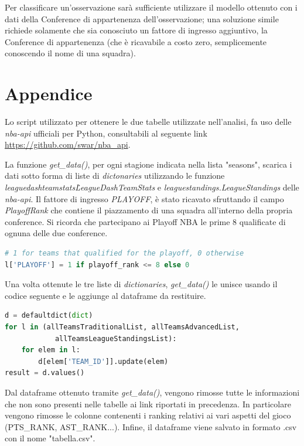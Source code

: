 \documentclass[11pt,a4paper]{article}
\begin{document}
Per classificare un'osservazione sarà sufficiente utilizzare il modello ottenuto con i dati della Conference di appartenenza dell'osservazione; una soluzione simile richiede solamente che sia conosciuto un fattore di ingresso aggiuntivo, la Conference di appartenenza (che è ricavabile a costo zero, semplicemente conoscendo il nome di una squadra).

\newpage
\appendix
\section{Appendice}
 Lo script utilizzato per ottenere le due tabelle utilizzate nell'analisi, fa uso delle \emph{nba-api} ufficiali per Python, consultabili al seguente link \url{https://github.com/swar/nba_api}.
 
La funzione \emph{get\_data()}, per ogni stagione indicata nella lista "seasons", scarica i dati sotto forma di liste di \emph{dictonaries} utilizzando le funzione \emph{leaguedashteamstats\.LeagueDashTeamStats} e \emph{leaguestandings.LeagueStandings} delle \emph{nba-api}. Il fattore di ingresso \emph{PLAYOFF}, è stato ricavato sfruttando il campo \emph{PlayoffRank} che contiene il piazzamento di una squadra all'interno della propria conference. Si ricorda che partecipano ai Playoff NBA le prime 8 qualificate di ognuna delle due conference.
 
 \vspace{0.5cm}
 \begin{lstlisting}[language=python,tabsize=1,frame = single]
# 1 for teams that qualified for the playoff, 0 otherwise
l['PLAYOFF'] = 1 if playoff_rank <= 8 else 0
\end{lstlisting}
\vspace{0.5cm}
 
 Una volta ottenute le tre liste di \emph{dictionaries}, \emph{get\_data()} le unisce usando il codice seguente e le aggiunge al dataframe da restituire.

\vspace{0.5cm} 
\begin{lstlisting}[language=python,tabsize=1,frame = single]
d = defaultdict(dict)
for l in (allTeamsTraditionalList, allTeamsAdvancedList, 
            allTeamsLeagueStandingsList):
    for elem in l:
        d[elem['TEAM_ID']].update(elem)
result = d.values()
\end{lstlisting}
\vspace{0.5cm}
 
Dal dataframe ottenuto tramite \emph{get\_data()}, vengono rimosse tutte le informazioni che non sono presenti nelle tabelle ai link riportati in precedenza. In particolare vengono rimosse le colonne contenenti i ranking relativi ai vari aspetti del gioco (PTS\_RANK, AST\_RANK...). Infine, il dataframe viene salvato in formato .csv con il nome "tabella.csv".
\end{document}
